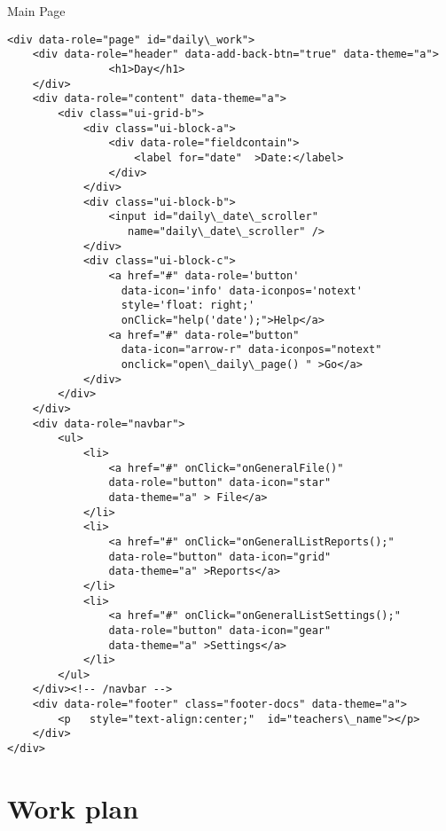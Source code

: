 \begin{bclogo}[couleur=blue!30,arrondi=0.1, logo=\bcpanchant, barre=zigzag,  ombre=true ] 
{Main Page}
\begin{verbatim}
<div data-role="page" id="daily\_work">
    <div data-role="header" data-add-back-btn="true" data-theme="a">
                <h1>Day</h1>
    </div>
    <div data-role="content" data-theme="a">
        <div class="ui-grid-b">
            <div class="ui-block-a">
                <div data-role="fieldcontain">
                    <label for="date"  >Date:</label>
                </div>
            </div>
            <div class="ui-block-b">
                <input id="daily\_date\_scroller"
                   name="daily\_date\_scroller" />
            </div>
            <div class="ui-block-c">
                <a href="#" data-role='button' 
                  data-icon='info' data-iconpos='notext' 
                  style='float: right;' 
                  onClick="help('date');">Help</a>
                <a href="#" data-role="button" 
                  data-icon="arrow-r" data-iconpos="notext"  
                  onclick="open\_daily\_page() " >Go</a>
            </div>
        </div>
    </div>
    <div data-role="navbar">
        <ul>
            <li>
                <a href="#" onClick="onGeneralFile()"  
                data-role="button" data-icon="star"  
                data-theme="a" > File</a>
            </li>
            <li>
                <a href="#" onClick="onGeneralListReports();"  
                data-role="button" data-icon="grid"  
                data-theme="a" >Reports</a>
            </li>
            <li>
                <a href="#" onClick="onGeneralListSettings();" 
                data-role="button" data-icon="gear"   
                data-theme="a" >Settings</a>
            </li>
        </ul>
    </div><!-- /navbar -->
    <div data-role="footer" class="footer-docs" data-theme="a">
        <p   style="text-align:center;"  id="teachers\_name"></p>
    </div>
</div> 
\end{verbatim}

\end{bclogo}

\newpage

	
\section {Work plan}

